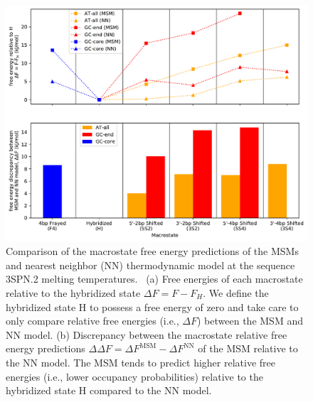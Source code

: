 \documentclass[journal=jpcbfk,manuscript=article]{achemso}
\newcommand*{\rood}[1]{{#1}}
\begin{document}
\begin{figure}[ht!]
	\begin{center} 
        \includegraphics[width=160mm, scale=1]{Fig3.pdf}
        \caption{Comparison of the macrostate free energy predictions of the MSMs and nearest neighbor (NN) thermodynamic model \rood{at the sequence 3SPN.2 melting temperatures}.~\citep{SantaLucia1998AThermodynamics, Santalucia2004TheMotifs} (a) Free energies of each macrostate relative to the hybridized state $\Delta F = F - F_H$. We define the hybridized state H to possess a free energy of zero and take care to only compare relative free energies (i.e., $\Delta F$) between the MSM and NN model. (b) Discrepancy between the macrostate relative free energy predictions $\Delta \Delta F = \Delta F^\mathrm{MSM} - \Delta F^\mathrm{NN}$ of the MSM relative to the NN model. The MSM tends to predict higher relative free energies (i.e., lower occupancy probabilities) relative to the hybridized state H compared to the NN model.}
        \label{fig:NN_table}
	\end{center}
\end{figure}
\end{document}
